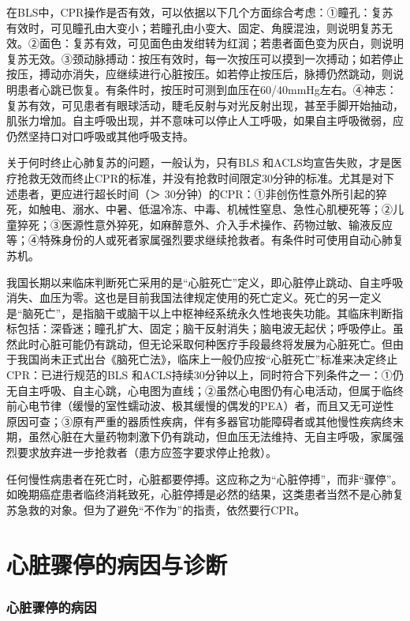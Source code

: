 在BLS中，CPR操作是否有效，可以依据以下几个方面综合考虑：①瞳孔：复苏有效时，可见瞳孔由大变小；若瞳孔由小变大、固定、角膜混浊，则说明复苏无效。②面色：复苏有效，可见面色由发绀转为红润；若患者面色变为灰白，则说明复苏无效。③颈动脉搏动：按压有效时，每一次按压可以摸到一次搏动；如若停止按压，搏动亦消失，应继续进行心脏按压。如若停止按压后，脉搏仍然跳动，则说明患者心跳已恢复。有条件时，按压时可测到血压在60/40mmHg左右。④神志：复苏有效，可见患者有眼球活动，睫毛反射与对光反射出现，甚至手脚开始抽动，肌张力增加。自主呼吸出现，并不意味可以停止人工呼吸，如果自主呼吸微弱，应仍然坚持口对口呼吸或其他呼吸支持。

关于何时终止心肺复苏的问题，一般认为，只有BLS
和ACLS均宣告失败，才是医疗抢救无效而终止CPR的标准，并没有抢救时间限定30分钟的标准。尤其是对下述患者，更应进行超长时间（＞
30分钟）的CPR：①非创伤性意外所引起的猝死，如触电、溺水、中暑、低温冷冻、中毒、机械性窒息、急性心肌梗死等；②儿童猝死；③医源性意外猝死，如麻醉意外、介入手术操作、药物过敏、输液反应等；④特殊身份的人或死者家属强烈要求继续抢救者。有条件时可使用自动心肺复苏机。

我国长期以来临床判断死亡采用的是“心脏死亡”定义，即心脏停止跳动、自主呼吸消失、血压为零。这也是目前我国法律规定使用的死亡定义。死亡的另一定义是“脑死亡”，是指脑干或脑干以上中枢神经系统永久性地丧失功能。其临床判断指标包括：深昏迷；瞳孔扩大、固定；脑干反射消失；脑电波无起伏；呼吸停止。虽然此时心脏可能仍有跳动，但无论采取何种医疗手段最终将发展为心脏死亡。但由于我国尚未正式出台《脑死亡法》，临床上一般仍应按“心脏死亡”标准来决定终止CPR：已进行规范的BLS
和ACLS持续30分钟以上，同时符合下列条件之一：①仍无自主呼吸、自主心跳，心电图为直线；②虽然心电图仍有心电活动，但属于临终前心电节律（缓慢的室性蠕动波、极其缓慢的偶发的PEA）者，而且又无可逆性原因可查；③原有严重的器质性疾病，伴有多器官功能障碍者或其他慢性疾病终末期，虽然心脏在大量药物刺激下仍有跳动，但血压无法维持、无自主呼吸，家属强烈要求放弃进一步抢救者（患方应签字要求停止抢救）。

任何慢性病患者在死亡时，心脏都要停搏。这应称之为“心脏停搏”，而非“骤停”。如晚期癌症患者临终消耗致死，心脏停搏是必然的结果，这类患者当然不是心肺复苏急救的对象。但为了避免“不作为”的指责，依然要行CPR。

\protect\hypertarget{text00281.html}{}{}

\section{心脏骤停的病因与诊断}

\subsubsection{心脏骤停的病因}

